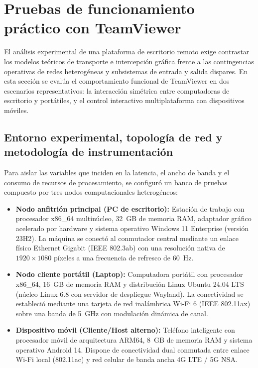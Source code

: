 \documentclass[12pt]{article}
\begin{document}
\section{Pruebas de funcionamiento práctico con TeamViewer}\label{sec:pruebasTeamViewer}

El análisis experimental de una plataforma de escritorio remoto exige contrastar los modelos teóricos de transporte e intercepción gráfica frente a las contingencias operativas de redes heterogéneas y subsistemas de entrada y salida dispares. En esta sección se evalúa el comportamiento funcional de TeamViewer en dos escenarios representativos: la interacción simétrica entre computadoras de escritorio y portátiles, y el control interactivo multiplataforma con dispositivos móviles.

\subsection{Entorno experimental, topología de red y metodología de instrumentación}\label{sec:entornoExperimental}

Para aislar las variables que inciden en la latencia, el ancho de banda y el consumo de recursos de procesamiento, se configuró un banco de pruebas compuesto por tres nodos computacionales heterogéneos:
\begin{itemize}[noitemsep, topsep=4pt]
    \item \textbf{Nodo anfitrión principal (PC de escritorio):} Estación de trabajo con procesador x86\_64 multinúcleo, 32~GB de memoria RAM, adaptador gráfico acelerado por hardware y sistema operativo Windows 11 Enterprise (versión 23H2). La máquina se conectó al conmutador central mediante un enlace físico Ethernet Gigabit (IEEE 802.3ab) con una resolución nativa de $1920 \times 1080$ píxeles a una frecuencia de refresco de 60~Hz.
    \item \textbf{Nodo cliente portátil (Laptop):} Computadora portátil con procesador x86\_64, 16~GB de memoria RAM y distribución Linux Ubuntu 24.04 LTS (núcleo Linux 6.8 con servidor de despliegue Wayland). La conectividad se estableció mediante una tarjeta de red inalámbrica Wi-Fi 6 (IEEE 802.11ax) sobre una banda de 5~GHz con modulación dinámica de canal.
    \item \textbf{Dispositivo móvil (Cliente/Host alterno):} Teléfono inteligente con procesador móvil de arquitectura ARM64, 8~GB de memoria RAM y sistema operativo Android 14. Dispone de conectividad dual conmutada entre enlace Wi-Fi local (802.11ac) y red celular de banda ancha 4G LTE / 5G NSA.
\end{itemize}
\end{document}
